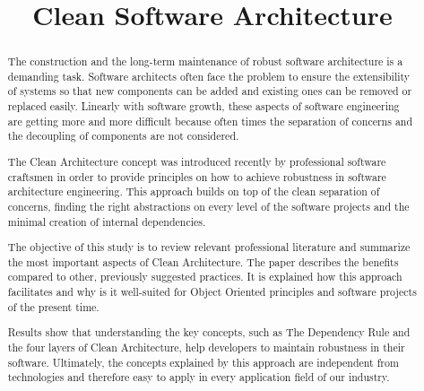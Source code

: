 \documentclass[conference]{IEEEtran}
\begin{document}
\title{Clean Software Architecture}

\author{
}

\maketitle

\begin{abstract}
The construction and the long-term maintenance of robust software architecture is a demanding task. Software architects often face the problem to ensure the extensibility of systems so that new components can be added and existing ones can be removed or replaced easily. Linearly with software growth, these aspects of software engineering are getting more and more difficult because often times the separation of concerns and the decoupling of components are not considered.  

The Clean Architecture concept was introduced recently by professional software craftsmen in order to provide principles on how to achieve robustness in software architecture engineering. This approach builds on top of the clean separation of concerns, finding the right abstractions on every level of the software projects and the minimal creation of internal dependencies.

The objective of this study is to review relevant professional literature and summarize the most important aspects of Clean Architecture. The paper describes the benefits compared to other, previously suggested practices. It is explained how this approach facilitates and why is it well-suited for Object Oriented principles and software projects of the present time. 

Results show that understanding the key concepts, such as The Dependency Rule and the four layers of Clean Architecture, help developers to maintain robustness in their software. Ultimately, the concepts explained by this approach are independent from technologies and therefore easy to apply in every application field of our industry. 
\end{abstract}
\end{document}
